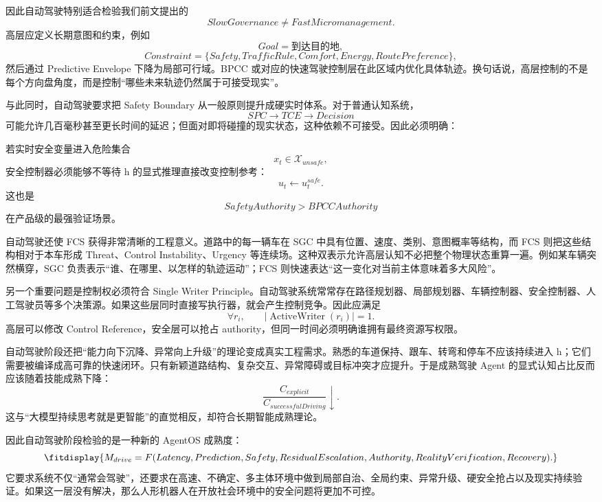 因此自动驾驶特别适合检验我们前文提出的
\[
\boxed{
SlowGovernance\neq FastMicromanagement.
}
\]
高层应定义长期意图和约束，例如
\[
Goal=\text{到达目的地},
\]
\[
Constraint=
\{
Safety,
TrafficRule,
Comfort,
Energy,
RoutePreference
\},
\]
然后通过 Predictive Envelope 下降为局部可行域。BPCC 或对应的快速驾驶控制层在此区域内优化具体轨迹。换句话说，高层控制的不是每个方向盘角度，而是控制“哪些未来轨迹仍然属于可接受现实”。

与此同时，自动驾驶要求把 Safety Boundary 从一般原则提升成硬实时体系。对于普通认知系统，
\[
SPC
\rightarrow
TCE
\rightarrow
Decision
\]
可能允许几百毫秒甚至更长时间的延迟；但面对即将碰撞的现实状态，这种依赖不可接受。因此必须明确：
\begin{statementbox}
\centering
{}
\end{statementbox}
若实时安全变量进入危险集合
\[
x_t\in\mathcal{X}_{unsafe},
\]
安全控制器必须能够不等待 h 的显式推理直接改变控制参考：
\[
u_t
\leftarrow
u_t^{safe}.
\]
这也是
\[
SafetyAuthority
>
BPCCAuthority
\]
在产品级的最强验证场景。

自动驾驶还使 FCS 获得非常清晰的工程意义。道路中的每一辆车在 SGC 中具有位置、速度、类别、意图概率等结构，而 FCS 则把这些结构相对于本车形成 Threat、Control Instability、Urgency 等连续场。这种双表示允许高层认知不必把整个物理状态重算一遍。例如某车辆突然横穿，SGC 负责表示“谁、在哪里、以怎样的轨迹运动”；FCS 则快速表达“这一变化对当前主体意味着多大风险”。

另一个重要问题是控制权必须符合 Single Writer Principle。自动驾驶系统常常存在路径规划器、局部规划器、车辆控制器、安全控制器、人工驾驶员等多个决策源。如果这些层同时直接写执行器，就会产生控制竞争。因此应满足
\[
\forall r_i,\qquad
|\operatorname{ActiveWriter}(r_i)|=1.
\]
高层可以修改 Control Reference，安全层可以抢占 authority，但同一时间必须明确谁拥有最终资源写权限。

自动驾驶阶段还把“能力向下沉降、异常向上升级”的理论变成真实工程需求。熟悉的车道保持、跟车、转弯和停车不应该持续进入 h；它们需要被编译成高可靠的快速闭环。只有新颖道路结构、复杂交互、异常障碍或目标冲突才应提升。于是成熟驾驶 Agent 的显式认知占比反而应该随着技能成熟下降：
\[
\frac{
C_{explicit}
}{
C_{successfulDriving}
}
\downarrow.
\]
这与“大模型持续思考就是更智能”的直觉相反，却符合长期智能成熟理论。

因此自动驾驶阶段检验的是一种新的 AgentOS 成熟度：
\[
\fitdisplay{
M_{drive}
=
F(
Latency,
Prediction,
Safety,
ResidualEscalation,
Authority,
RealityVerification,
Recovery
).
}
\]
它要求系统不仅“通常会驾驶”，还要求在高速、不确定、多主体环境中做到局部自治、全局约束、异常升级、硬安全抢占以及现实持续验证。如果这一层没有解决，那么人形机器人在开放社会环境中的安全问题将更加不可控。

